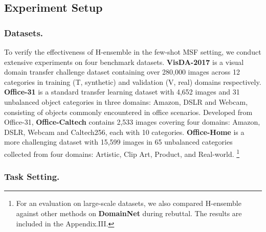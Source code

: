 \documentclass[letterpaper]{article} %
\begin{document}
\subsection{Experiment Setup}

\subsubsection{Datasets.}

To verify the effectiveness of H-ensemble in the few-shot MSF setting, we conduct extensive experiments on four benchmark datasets. \textbf{VisDA-2017} \citep{peng2017visda} is a visual domain transfer challenge dataset containing over 280,000 images across 12 categories in training (T, synthetic) and validation (V, real) domains respectively.
\textbf{Office-31} \citep{saenko2010adapting} is a standard transfer learning dataset with 4,652 images and 31 unbalanced object categories in three domains: Amazon, DSLR and Webcam, consisting of objects commonly encountered in office scenarios. Developed from Office-31, \textbf{Office-Caltech} \citep{gong2012geodesic} contains 2,533 images covering four domains: Amazon, DSLR, Webcam and Caltech256, each with 10 categories. \textbf{Office-Home} \citep{venkateswara2017deep} is a more challenging dataset with 15,599 images in 65 unbalanced categories collected from four domains: Artistic, Clip Art, Product, and Real-world. %
\footnote{For an evaluation on large-scale datasets, we also compared H-ensemble against other methods on \textbf{DomainNet} \citep{peng2019moment} during rebuttal. The results are included in the Appendix.III.}

\subsubsection{Task Setting.}

\end{document}
